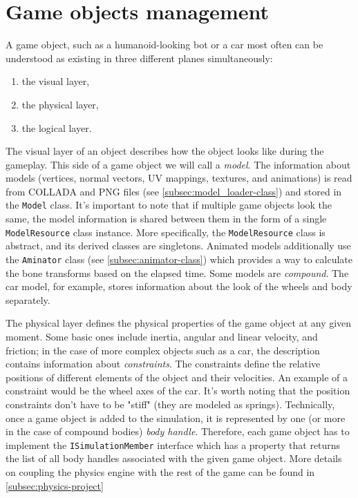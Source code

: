 \section{Game objects management}\label{sec:game_objects_management}
A game object, such as a humanoid-looking bot or a car most often can be understood as existing in three different planes simultaneously:
\begin{enumerate}
    \item the visual layer,
    \item the physical layer,
    \item the logical layer.
\end{enumerate}
The visual layer of an object describes how the object looks like during the gameplay.
This side of a game object we will call a \textit{model}.
The information about models (vertices, normal vectors, UV mappings, textures, and animations) is read from COLLADA and PNG files (see \autoref{subsec:model_loader-class}) and stored in the \texttt{Model} class.
It's important to note that if multiple game objects look the same, the model information is shared between them in the form of a single \texttt{ModelResource} class instance.
More specifically, the \texttt{ModelResource} class is abstract, and its derived classes are singletons.
Animated models additionally use the \texttt{Aminator} class (see \autoref{subsec:animator-class}) which provides a way to calculate the bone transforms based on the elapsed time.
Some models are \textit{compound}.
The car model, for example, stores information about the look of the wheels and body separately.

The physical layer defines the physical properties of the game object at any given moment.
Some basic ones include inertia, angular and linear velocity, and friction;
in the case of more complex objects such as a car, the description contains information about \textit{constraints}.
The constraints define the relative positions of different elements of the object and their velocities.
An example of a constraint would be the wheel axes of the car.
It's worth noting that the position constraints don't have to be "stiff" (they are modeled as springs).
Technically, once a game object is added to the simulation, it is represented by one (or more in the case of compound bodies) \textit{body handle}.
Therefore, each game object has to implement the \texttt{ISimulationMember} interface which has a property that returns the list of all body handles associated with the given game object.
More details on coupling the physics engine with the rest of the game can be found in \autoref{subsec:physics-project}

